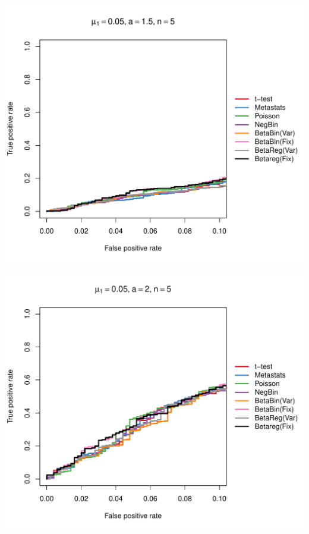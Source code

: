 \documentclass[12pt]{article}\usepackage{graphicx, color}
\makeatletter
\def\maxwidth{ %
  \ifdim\Gin@nat@width>\linewidth
    \linewidth
  \else
    \Gin@nat@width
  \fi
}
\newenvironment{knitrout}{}{} %
\makeatother
\begin{document}
\begin{knitrout}
{\centering \includegraphics[width=\maxwidth]{figure/rocs7} 

}




{\centering \includegraphics[width=\maxwidth]{figure/rocs8} 

}





\end{knitrout}
\end{document}
